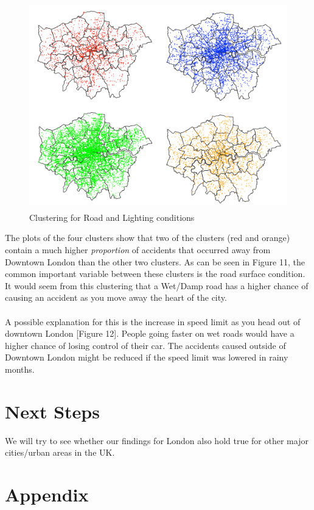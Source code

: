 \documentclass[a4paper, 11pt]{article}
\begin{document}
\begin{figure}[H]
    \begin{center}
      \includegraphics[height=9cm, scale=0.01,keepaspectratio]{4_clusters.png}
      \caption{Clustering for Road and Lighting conditions}
    \end{center}
\end{figure}

The plots of the four clusters show that two of the clusters (red and orange) contain a much higher \textit{proportion} of accidents that occurred away from Downtown London than the other two clusters.
As can be seen in Figure 11, the common important variable between these clusters is the road surface condition. It would seem from this clustering that a Wet/Damp road has a higher chance of causing an accident as you move away the heart of the city. \\ \\

A possible explanation for this is the increase in speed limit as you head out of downtown London [Figure 12]. People going faster on wet roads would have a higher chance of losing control of their car. The accidents caused outside of Downtown London might be reduced if the speed limit was lowered in rainy months.

\section{Next Steps}

We will try to see whether our findings for London also hold true for other major cities/urban areas in the UK. 
\pagebreak
\section{Appendix}
\end{document}
